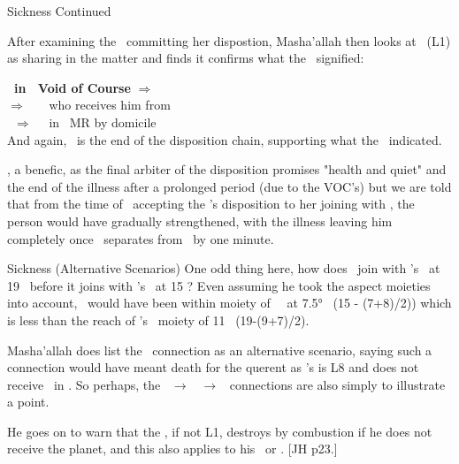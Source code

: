 \begin{frame}[t]{Sickness Continued}

After examining the \Moon\ committing her dispostion, Masha'allah then looks at \Mercury\ (L1) as sharing in the matter and finds it confirms what the \Moon\ signified:

\textbf{\Mercury\ in \Aries\ Void of Course} $\Rightarrow$ \Taurus \\
$\Rightarrow$ \Sextile\ \Venus\ \Pisces\ who receives him from \Taurus \\
\Venus\ $\Rightarrow$ \Trine\ \Jupiter\ in \Taurus\, MR by domicile \\
And again, \Jupiter\ is the end of the disposition chain, supporting what the \Moon\ indicated.
\vspace{0.2cm}

\Jupiter, a benefic, as the final arbiter of the disposition promises "health and quiet" and the end of the illness after a prolonged period (due to the VOC's) but we are told that from the time of \Venus\ accepting the \Moon's disposition to her joining with \Jupiter, the person would have gradually strengthened, with the illness leaving him completely once \Venus\ separates from \Jupiter\ by one minute.

\end{frame}
\begin{frame}[t]{Sickness (Alternative Scenarios)}
One odd thing here, how does \Venus\ join with \Jupiter's \Sextile\ at 19 \Pisces\ before it joins with \Mars's \Square\ at 15 \Pisces? Even assuming he took the aspect moieties into account, \Venus\ would have been within moiety of \Mars\ \Square\ at 7.5° \Pisces\ (15 - (7+8)/2)) which is less than the reach of \Jupiter's \Sextile\ moiety of 11 \Pisces\ (19-(9+7)/2). 

\vspace{0.3cm}
Masha'allah does list the \Mars\ connection as an alternative scenario, saying such a connection would have meant death for the querent as \Mars's is L8 and does not receive \Venus\ in \Pisces. So perhaps, the \Moon\ $\rightarrow$ \Venus\ $\rightarrow$ \Jupiter\ connections are also simply to illustrate a point.

He goes on to warn that the \Sun, if not L1, destroys by combustion if he does not receive the planet, and this also applies to his \Square\ or \Opposition. [JH p23.]\footnotemark[1]

\end{frame}